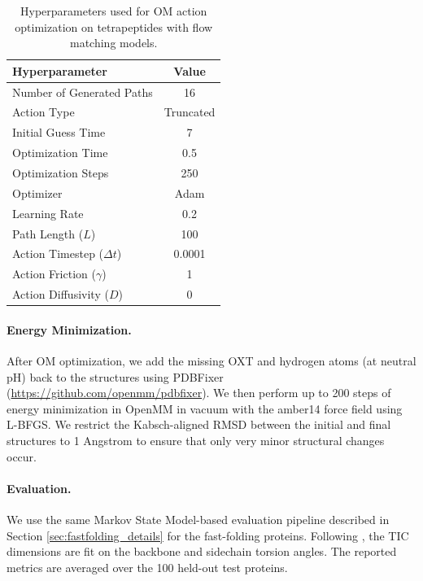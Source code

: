 \begin{table}[h]
\caption{Hyperparameters used for OM action optimization on tetrapeptides with flow matching models.}
\label{tab:om_optimization_details_diffusion_tetra}
\scriptsize
\centering
    \begin{tabular}{lc}
        \toprule
        \textbf{Hyperparameter} & \textbf{Value}\\
        \midrule
        Number of Generated Paths & 16\\
        Action Type & Truncated\\
        Initial Guess Time & 7 \\
        Optimization Time & 0.5\\
        Optimization Steps & 250 \\
        Optimizer & Adam \\
        Learning Rate & 0.2\\
        Path Length ($L$) & 100 \\
        Action Timestep ($\Delta t$) &0.0001\\
        Action Friction ($\gamma$) & 1\\
        Action Diffusivity ($D$) & 0\\
        \bottomrule
    \end{tabular}
\end{table}

\paragraph{Energy Minimization.} After OM optimization, we add the missing OXT and hydrogen atoms (at neutral pH) back to the structures using PDBFixer (\url{https://github.com/openmm/pdbfixer}). We then perform up to 200 steps of energy minimization in OpenMM in vacuum with the amber14 force field using L-BFGS. We restrict the Kabsch-aligned RMSD between the initial and final structures to 1 Angstrom to ensure that only very minor structural changes occur. 

\paragraph{Evaluation.} We use the same Markov State Model-based evaluation pipeline described in Section \ref{sec:fastfolding_details} for the fast-folding proteins. Following \cite{jing2024generative}, the TIC dimensions are fit on the backbone and sidechain torsion angles. The reported metrics are averaged over the 100 held-out test proteins.

